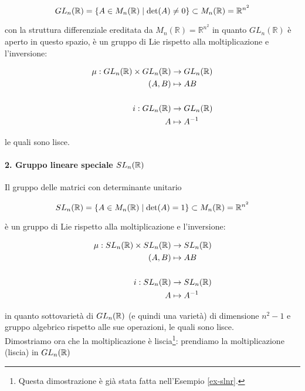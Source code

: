 \begin{equation}
	GL_{n}(\mathbb{R}) = \{ A \in M_{n}(\mathbb{R}) \mid \det(A) \neq 0 \} \subset M_{n}(\mathbb{R}) = \mathbb{R}^{n^{2}}
\end{equation}

con la struttura differenziale ereditata da $ M_{n}(\mathbb{R}) = \mathbb{R}^{n^{2}} $ in quanto $ GL_{n}(\mathbb{R}) $ è aperto in questo spazio, è un gruppo di Lie rispetto alla moltiplicazione e l'inversione:

\begin{align}
	\begin{split}
		\mu : GL_{n}(\mathbb{R}) \times GL_{n}(\mathbb{R}) &\to GL_{n}(\mathbb{R})\\
		(A,B) &\mapsto A B\\\\
		i : GL_{n}(\mathbb{R}) &\to GL_{n}(\mathbb{R})\\
		A &\mapsto A^{-1}
	\end{split}
\end{align}

le quali sono lisce.

\paragraph{2. Gruppo lineare speciale $ SL_{n}(\mathbb{R}) $}

Il gruppo delle matrici con determinante unitario

\begin{equation}
	SL_{n}(\mathbb{R}) = \{ A \in M_{n}(\mathbb{R}) \mid \det(A) = 1 \} \subset M_{n}(\mathbb{R}) = \mathbb{R}^{n^{2}}
\end{equation}

è un gruppo di Lie rispetto alla moltiplicazione e l'inversione:

\begin{align}
	\begin{split}
		\mu : SL_{n}(\mathbb{R}) \times SL_{n}(\mathbb{R}) &\to SL_{n}(\mathbb{R})\\
		(A,B) &\mapsto A B\\\\
		i : SL_{n}(\mathbb{R}) &\to SL_{n}(\mathbb{R})\\
		A &\mapsto A^{-1}
	\end{split}
\end{align}

in quanto sottovarietà di $ GL_{n}(\mathbb{R}) $ (e quindi una varietà) di dimensione $ n^{2}-1 $ e gruppo algebrico rispetto alle sue operazioni, le quali sono lisce.\\
Dimostriamo ora che la moltiplicazione è liscia\footnote{%
	Questa dimostrazione è già stata fatta nell'Esempio \ref{ex-slnr}.%
}: prendiamo la moltiplicazione (liscia) in $ GL_{n}(\mathbb{R}) $

